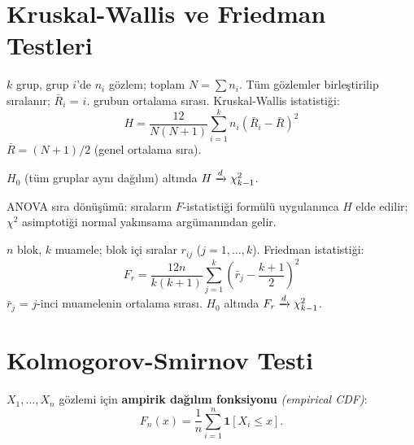 \section{Kruskal-Wallis ve Friedman Testleri}
\label{sec:kruskal_friedman}

\begin{tanim}\label{def:kruskal_wallis}
$k$ grup, grup $i$'de $n_i$ gözlem; toplam $N=\sum n_i$. Tüm gözlemler birleştirilip sıralanır; $\bar{R}_i$ = $i$. grubun ortalama sırası. Kruskal-Wallis istatistiği:
\[
  H = \frac{12}{N(N+1)}\sum_{i=1}^k n_i(\bar{R}_i - \bar{R})^2
\]
$\bar{R}=(N+1)/2$ (genel ortalama sıra).
\end{tanim}

\begin{teorem}\label{thm:kruskal_asimptotik}
$H_0$ (tüm gruplar aynı dağılım) altında $H\xrightarrow{d}\chi^2_{k-1}$.
\end{teorem}

\begin{ispatiskele}
ANOVA sıra dönüşümü: sıraların $F$-istatistiği formülü uygulanınca $H$ elde edilir; $\chi^2$ asimptotiği normal yakınsama argümanından gelir.
\end{ispatiskele}

\begin{tanim}\label{def:friedman}
$n$ blok, $k$ muamele; blok içi sıralar $r_{ij}$ ($j=1,\ldots,k$). Friedman istatistiği:
\[
  F_r = \frac{12n}{k(k+1)}\sum_{j=1}^k\!\left(\bar{r}_j - \frac{k+1}{2}\right)^{\!2}
\]
$\bar{r}_j$ = $j$-inci muamelenin ortalama sırası. $H_0$ altında $F_r\xrightarrow{d}\chi^2_{k-1}$.
\end{tanim}

\section{Kolmogorov-Smirnov Testi}
\label{sec:ks_testi}

\begin{tanim}\label{def:ampirik_df}
$X_1,\ldots,X_n$ gözlemi için \textbf{ampirik dağılım fonksiyonu} \emph{(empirical CDF)}:
\[
  F_n(x) = \frac{1}{n}\sum_{i=1}^n\mathbf{1}[X_i\leq x].
\]
\end{tanim}


